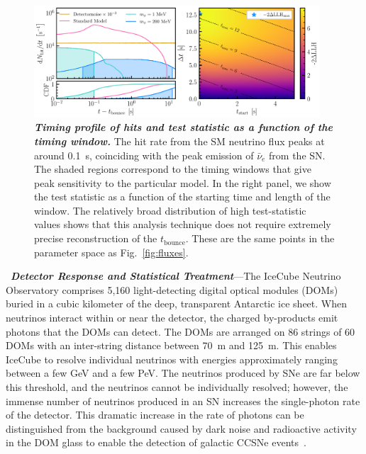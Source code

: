 \begin{figure}[t]
    \centering
    \includegraphics[width=0.95\textwidth]{figures/hits_and_likelihood.pdf}
    \caption{\textbf{\textit{Timing profile of hits and test statistic as a function of the timing window.}}
    The hit rate from the SM neutrino flux peaks at around 0.1~s, coinciding with the peak emission of $\bar{\nu}_{e}$ from the SN.
    The shaded regions correspond to the timing windows that give peak sensitivity to the particular model.
    In the right panel, we show the test statistic as a function of the starting time and length of the window.
    The relatively broad distribution of high test-statistic values shows that this analysis technique does not require extremely precise reconstruction of the $t_{\mathrm{bounce}}$.
    These are the same points in the parameter space as Fig.~\ref{fig:fluxes}.
    }
    \label{fig:hits_and_likelihood}
\end{figure}
\
\textbf{\textit{Detector Response and Statistical Treatment}}---The IceCube Neutrino Observatory comprises 5,160 light-detecting digital optical modules (DOMs) buried in a cubic kilometer of the deep, transparent Antarctic ice sheet.
When neutrinos interact within or near the detector, the charged by-products emit photons that the DOMs can detect.
The DOMs are arranged on 86 strings of 60 DOMs with an inter-string distance between 70~m and 125~m.
This enables IceCube to resolve individual neutrinos with energies approximately ranging between a few GeV and a few PeV.
The neutrinos produced by SNe are far below this threshold, and the neutrinos cannot be individually resolved; however, the immense number of neutrinos produced in an SN increases the single-photon rate of the detector.
This dramatic increase in the rate of photons can be distinguished from the background caused by dark noise and radioactive activity in the DOM glass to enable the detection of galactic CCSNe events~\cite{Griswold:2023iwz}.

